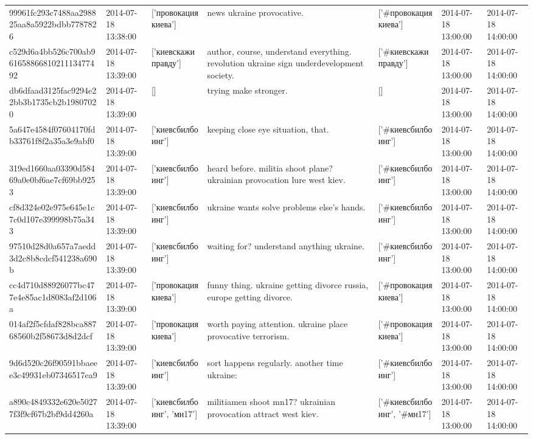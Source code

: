 \begin{tabular}{lllllll}
99961fc293c7488aa298825aa8a5922bdbb7787826 & 2014-07-18 13:38:00 & ['провокациякиева'] & news ukraine provocative. & ['#провокациякиева'] & 2014-07-18 13:00:00 & 2014-07-18 14:00:00 \\
c529d6a4bb526c700ab96165886681021113477492 & 2014-07-18 13:39:00 & ['киевскажиправду'] & author, course, understand everything. revolution ukraine sign underdevelopment society. & ['#киевскажиправду'] & 2014-07-18 13:00:00 & 2014-07-18 14:00:00 \\
db6dfaad3125fac9294e22bb3b1735cb2b19807020 & 2014-07-18 13:39:00 & [] & trying make stronger. & [] & 2014-07-18 13:00:00 & 2014-07-18 14:00:00 \\
5a647e4584f07604170fdb33761f8f2a35a3e9abf0 & 2014-07-18 13:39:00 & ['киевсбилбоинг'] & keeping close eye situation, that. & ['#киевсбилбоинг'] & 2014-07-18 13:00:00 & 2014-07-18 14:00:00 \\
319ed1660aa03390d58469a0e0bf6ae7cf69bb9253 & 2014-07-18 13:39:00 & ['киевсбилбоинг'] & heard before. militia shoot plane? ukrainian provocation lure west kiev. & ['#киевсбилбоинг'] & 2014-07-18 13:00:00 & 2014-07-18 14:00:00 \\
cf8d324e02e975e645e1c7c0d107e399998b75a343 & 2014-07-18 13:39:00 & ['киевсбилбоинг'] & ukraine wants solve problems else's hands. & ['#киевсбилбоинг'] & 2014-07-18 13:00:00 & 2014-07-18 14:00:00 \\
97510d28d0a657a7aedd3d2c8b8cdcf541238a690b & 2014-07-18 13:39:00 & ['киевсбилбоинг'] & waiting for? understand anything ukraine. & ['#киевсбилбоинг'] & 2014-07-18 13:00:00 & 2014-07-18 14:00:00 \\
cc4d710d88926077bc477e4e85ac1d8083af2d106a & 2014-07-18 13:39:00 & ['провокациякиева'] & funny thing. ukraine getting divorce russia, europe getting divorce. & ['#провокациякиева'] & 2014-07-18 13:00:00 & 2014-07-18 14:00:00 \\
014af2f5cfdaf828bca88768560b2f58673d8d2dcf & 2014-07-18 13:39:00 & ['провокациякиева'] & worth paying attention. ukraine place provocative terrorism. & ['#провокациякиева'] & 2014-07-18 13:00:00 & 2014-07-18 14:00:00 \\
9d6d520c26f90591bbaeee3c49931eb07346517ea9 & 2014-07-18 13:39:00 & ['киевсбилбоинг'] & sort happens regularly. another time ukraine: & ['#киевсбилбоинг'] & 2014-07-18 13:00:00 & 2014-07-18 14:00:00 \\
a890c4849332e620e50277f3f9cf67b2bf9dd4260a & 2014-07-18 13:39:00 & ['киевсбилбоинг', 'мн17'] & militiamen shoot mn17? ukrainian provocation attract west kiev. & ['#киевсбилбоинг', '#мн17'] & 2014-07-18 13:00:00 & 2014-07-18 14:00:00 \\

\end{tabular}
